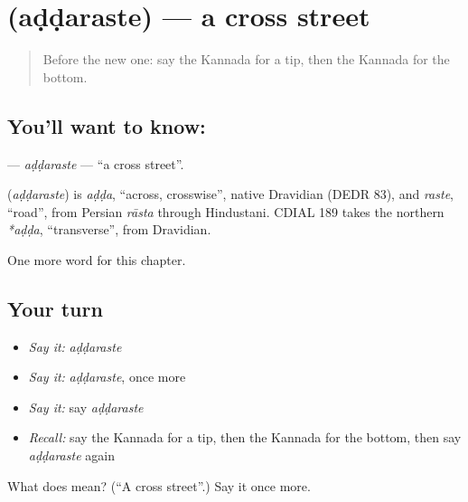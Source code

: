 \section[\texorpdfstring{\kn{ಅಡ್ಡರಸ್ತೆ} (aḍḍaraste)}{ಅಡ್ಡರಸ್ತೆ (aḍḍaraste)}]{ (aḍḍaraste) — a cross street}

\label{lesson:KA-C214-addaraste}



\begin{quote}
Before the new one: say the Kannada for a tip, then the Kannada for the bottom.
\end{quote}

\subsection*{You'll want to know: }
\textbf{} — \emph{aḍḍaraste} — \textquotedblleft{}a cross street\textquotedblright{}.

\begin{cousinweb}
\textbf{} (\emph{aḍḍaraste}) is \emph{aḍḍa}, \textquotedblleft{}across, crosswise\textquotedblright{}, native Dravidian (DEDR 83), and \emph{raste}, \textquotedblleft{}road\textquotedblright{}, from Persian \emph{rāsta} through Hindustani. CDIAL 189 takes the northern \emph{*aḍḍa}, \textquotedblleft{}transverse\textquotedblright{}, from Dravidian.
\end{cousinweb}

\begin{grammarlens}[title={What you've built}]
One more word for this chapter.
\end{grammarlens}

\subsection*{Your turn}
\begin{itemize}
\raggedright
  \item \emph{Say it:} \emph{aḍḍaraste}
  \item \emph{Say it:} \emph{aḍḍaraste}, once more
  \item \emph{Say it:} say \emph{aḍḍaraste}
  \item \emph{Recall:} say the Kannada for a tip, then the Kannada for the bottom, then say \emph{aḍḍaraste} again
\end{itemize}

\begin{tcolorbox}[breakable,colback=teal!4,colframe=teal!35!black,title={Before you move on}]
What does  mean? (\textquotedblleft{}A cross street\textquotedblright{}.) Say it once more.
\end{tcolorbox}
